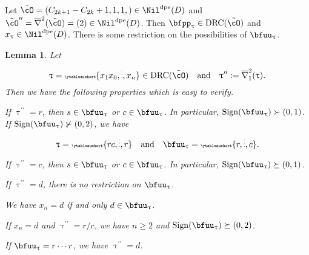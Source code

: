\documentclass[12pt,a4paper]{amsart}
\def\eDD{\overline{\nabla}}
\def\eDDo{\overline{\nabla}_1}
\numberwithin{equation}{section}
\newtheorem{lem}[thm]{Lemma}
\theoremstyle{remark}
\def\dpeNil{\Nil^{\mathrm{dpe}}}
\def\ssign{\mathrm{Sign}}
\def\drc{\mathrm{DRC}}
\let\ytb=\ytableaushort
\newcommand{\tytb}[1]{{\tiny\ytb{#1}}}
\def\uptaupp{\uptau^{\prime\prime}}
\def\tcO{\tilde{\cO}}
\def\tcOpp{\tcO^{\prime\prime}}
\begin{document}
Let $\tcO = (C_{2k+1}-C_{2k}+1,1,1,)\in \dpeNil(D)$ and
$\tcOpp = \eDD^{2}(\tcO) = (2)\in \dpeNil(D)$. Then
$\bfpp_{\uptau}\in \drc(\tcO)$ and $x_{\uptau}\in\dpeNil(D)$.
There is some restriction on the possibilities  of $\bfuu_{\uptau}$.

\begin{lem}\label{lem:u}
  Let
  \[
    \uptau = \tytb{{x_{1}}{x_{0}},\vdots, {x_{n}}}\in \drc(\tcO)
    \quad \text{and}\quad \uptaupp:=\eDDo^{2}(\uptau).
  \]
  Then we have the following properties which is easy to verify.
  \begin{enumS}
    \item  If $\uptaupp = r$, then $s \in \bfuu_{\uptau}$ or
    $c \in \bfuu_{\uptau}$. In particular, $\ssign(\bfuu_{\uptau})\succ (0,1)$.
    If $\ssign(\bfuu_{\uptau})\nsucc (0,2)$, we have
    \[
      \uptau = \tytb{rc, \vdots,r} \quad \text{and}\quad  \bfuu_{\uptau} = \tytb{r,\vdots,c}.
    \]
    \item  If $\uptaupp = c$, then $s \in \bfuu_{\uptau}$ or
    $c \in \bfuu_{\uptau}$. In particular, $\ssign(\bfuu_{\uptau})\succeq (0,1)$.
    \item If $\uptaupp = d$, there is no restriction on $\bfuu_{\uptau}$.
    \item  We have $x_{n}=d$ if and only $d\in \bfuu_{\uptau}$.
    \item If $x_{n}=d$ and $\uptaupp =r/c$,  we have $n\geq 2$ and
    $\ssign(\bfuu_{\uptau})\succeq (0,2)$.
    \item If $\bfuu_{\uptau} = r\cdots r$, we have $\uptaupp=d$.
  \end{enumS}

\end{lem}
\end{document}
